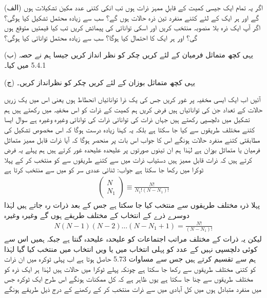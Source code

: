 (الف) اگر یہ تمام ایک جیسی کمیت کے قابلِ ممہز ذرات ہوں تب انکی کتنی عدد مکین تشکیلات  ہوں گے اور ہر ایک کے لئے کتنے منفرد تین ذرہ حالات ہوں گے؟ سب سے زیادہ محتمل تشکیل کیا ہوگی؟ اگر آپ ایک ذرہ بلا منصوبہ منتخب کریں اور اسکی توانائی کی پیمائش کریں تب کیا قیمتیں متوقع ہوں گی؟ اور ہر ایک کا احتمال کیا ہوگا؟ سب سے زیادہ محتمل توانائی کیا ہوگی؟

(ب) یہی کچھ متماثل فرمیان کے لئے کریں چکر کو نظر انداز کریں جیسا ہم نے حصہ 5.4.1 میں کیا۔

(ج) یہی کچھ متماثل بوزان کے لئے کریں چکر کو نظرانداز کریں۔ 

آئیں اب ایک ایسی مخفیہ پر غور کریں جس کی یک ذرا توانائیاں     انحطاط     ہوں یعنی اس میں یک زریں حالات کے تعداد  جن کی توانائیاں  ہیں فرض کریں ہم کمیت  کے  ذرات کو اس ‏مخفیہ میں رکھتے ہیں ہم تشکیل     میں دلچسپی رکھتے ہیں جہاں  ذرات کی توانائی   ذرات کی توانائی  وغیرہ وغیرہ ہے سوال ایسا کتنے مختلف طریقوں سے کیا جا سکتا ہے بلکہ یہ کہنا زیادہ درست ہوگا کہ اس مخصوص تشکیل کی مطابقتی کتنے منفرد حالات ہونگے اس کا جواب  اس بات پر منحصر ہوگا کہ آیا ذرات قابل ممیز متماثل فرميان یا متماثل بوزان ہے لہٰذا ہم ان تینوں صورتوں پر علیحدہ علیحدہ غور کرتے ہیں ہم پہلے یہ فرض کرتے ہیں کہ ذرات قابل ممیز ہیں دستیاب  ذرات میں سے کتنے طریقوں سے  کو منتخب کر کے پہلا ٹوکرا میں رکھا جا سکتا ہے جواب: ثنائی عددی سر  کو  میں سے منتخب کرتا ہے 
\begin{align}
\begin{pmatrix}
N \\
N_1
\end{pmatrix}
\equiv \frac{N!}{N_1 ! (N - N_1) !}
\end{align}
پہلا ذرہ  مختلف طریقوں سے منتخب کیا جا سکتا ہے جس کے بعد  ذرات رہ جاتے ہیں لہٰذا دوسرے ذرے کے انتخاب کے  مختلف طریقے ہوں گے وغیرہ وغیرہ 
\begin{align*}
N(N - 1) (N - 2) \dotsc (N - N_1 + 1) = \frac{N !}{(N - N_1) !}
\end{align*}
لیکن یہ  ذرات کے  مختلف مراتب اجتماعات کو علیحدہ علیحدہ گنتا  ہے جبکہ ہمیں اس سے کوئی دلچسپی نہیں کے عدد  کو پہلی انتخاب میں یا  ویں انتخاب میں منتخب کیا گیا لہٰذا ہم  سے تقسیم کرتے ہیں جس سے مساوات 5.73 حاصل ہوتا ہے اب پہلی ٹوکرہ میں ان  ذرات کو کتنی مختلف طریقوں سے رکھا جا سکتا ہے چونکہ پہلے ٹوکرا میں  حالات ہیں لہٰذا ہر ایک ذرہ کو  مختلف طریقوں سے چنا جا سکتا ہے یوں ظاہر ہے کہ کل ممکنات  ہونگے اس طرح ایک ٹوکرہ جس میں  منفرد متبادل ہوں میں کل آبادی  میں سے  ذرات منتخب کر کے رکھنے کے درج ذیل طریقے ہونگے 
